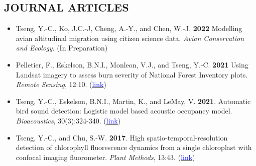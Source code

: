 \documentclass[11pt,letterpaper,sans]{moderncv}        %
\begin{document}
\subsection{JOURNAL ARTICLES}
\begin{itemize}

\item{Tseng, Y.-C., Ko, J.C.-J, Cheng, A.-Y., and Chen, W.-J. \textbf{2022} Modelling avian altitudinal migration using citizen science data. \textit{Avian Conservation and Ecology}. (In Preparation)}
\vspace{3pt}

\item{Pelletier, F., Eskelson, B.N.I., Monleon, V.J., and Tseng, Y.-C. \textbf{2021} Using Landsat imagery to assess burn severity of National Forest Inventory plots. \textit{Remote Sensing}, 12:10. (\href{https://www.mdpi.com/2072-4292/13/10/1935}{\textcolor{blue}{link}})}
\vspace{3pt}

\item{Tseng, Y.-C., Eskelson, B.N.I., Martin, K., and LeMay, V. \textbf{2021}. Automatic bird sound detection: Logistic model based acoustic occupancy model. \textit{Bioacoustics}, 30(3):324-340. (\href{https://www.tandfonline.com/doi/abs/10.1080/09524622.2020.1730241}{\textcolor{blue}{link}})}
\vspace{3pt}

\item{Tseng, Y.-C., and Chu, S.-W. \textbf{2017}. High spatio-temporal-resolution detection of chlorophyll fluorescence dynamics from a single chloroplast with confocal imaging fluorometer. \textit{Plant Methods}, 13:43. (\href{https://doi.org/10.1186/s13007-017-0194-2}{\textcolor{blue}{link}})}

\end{itemize}

\end{document}
